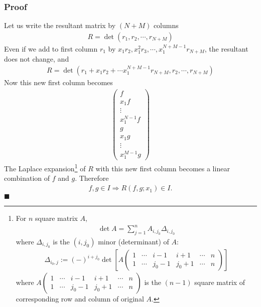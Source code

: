 \documentclass[11pt]{book}
\begin{document}
\subsubsection{Proof}
Let us write the resultant matrix by $(N+M)$ columns
\begin{eqnarray}
R = \det (r_1, r_2, \cdots, r_{N+M})
\end{eqnarray}
Even if we add to first column $r_1$ by $x_1 r_2, x_1^2 r_3, \cdots, x_1^{N+M-1} r_{N+M}$, the resultant does not change, and
\begin{eqnarray}
R = \det (r_1+ x_1 r_2 + \cdots x_1^{N+M-1} r_{N+M} , r_2, \cdots, r_{N+M})
\end{eqnarray}
Now this new first column becomes
\begin{eqnarray}
\left(\begin{array}{c} f \\ x_1 f  \\ \vdots  \\ x_1^{N-1} f  \\ g  \\ x_1 g  \\ \vdots \\ x_1^{M-1} g \end{array}\right)
\end{eqnarray}
The Laplace expansion\footnote{
For $n$ square matrix $A$,
\begin{eqnarray}
\det A = \sum_{j=1}^n A_{i, j_0} \Delta_{i, j_0}
\end{eqnarray}
where $\Delta_{i, j_0}$ is the $(i, j_0)$ minor (determinant) of $A$:
\begin{eqnarray}
\Delta_{i_0, j} := (-)^{i+j_0} \det\left[ A \left(\begin{array}{cccccc}1 & \cdots  &  i-1 & i+1  & \cdots  & n  \\ 1 & \cdots  & j_0 -1  & j_0 +1  & \cdots  & n \end{array}\right)
\right]
\end{eqnarray}
where $A \left(\begin{array}{cccccc}1 & \cdots  &  i-1 & i+1  & \cdots  & n  \\ 1 & \cdots  & j_0 -1  & j_0 +1  & \cdots  & n \end{array}\right)$ is the $(n-1)$ square matrix of corresponding row and column of original $A$.

} of $R$ with this new first column becomes a linear combination of $f$ and $g$.
Therefore
\begin{eqnarray}
f,g \in I \Rightarrow R(f,g; x_1) \in I.
\end{eqnarray}
$\blacksquare$
\end{document}
